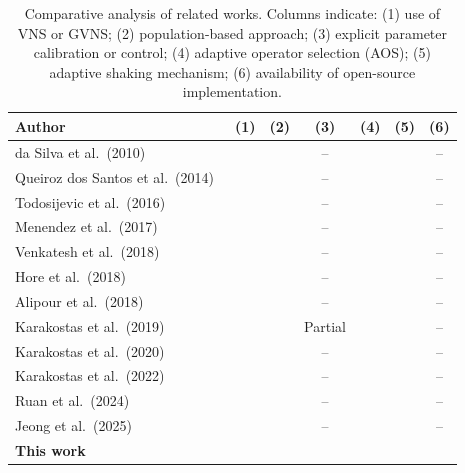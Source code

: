 \documentclass[runningheads]{llncs}
\newcommand{\cmark}{\ding{51}} %
\newcommand{\xmark}{\ding{55}} %
\begin{document}
\begin{table}[ht]
\centering
\caption{
Comparative analysis of related works.
Columns indicate: 
(1) use of VNS or GVNS; 
(2) population-based approach; 
(3) explicit parameter calibration or control; 
(4) adaptive operator selection (AOS); 
(5) adaptive shaking mechanism; 
(6) availability of open-source implementation.
}
\label{tab:comparison}
\begin{tabular}{lcccccc}
\hline
\textbf{Author} & \textbf{(1)} & \textbf{(2)} & \textbf{(3)} & \textbf{(4)} & \textbf{(5)} & \textbf{(6)} \\
\hline
da Silva et al.~(2010)~\cite{DASILVA2010203}       
& \cmark & \xmark & --      & \xmark & \xmark & -- \\

Queiroz dos Santos et al.~(2014)~\cite{QUEIROZDOSSANTOS20144939} 
& \cmark & \xmark & --      & \cmark & \xmark & -- \\

Todosijevic et al.~(2016)~\cite{TODOSIJEVIC2016873}      
& \cmark & \xmark & --      & \cmark & \xmark & -- \\

Menendez et al.~(2017)~\cite{MENENDEZ201782} 
& \cmark & \xmark & --      & \xmark & \xmark & -- \\

Venkatesh et al.~(2018)~\cite{VENKATESH2018189}        
& \cmark & \xmark & --      & \xmark & \xmark & -- \\

Hore et al.~(2018)~\cite{HORE201883}              
& \cmark & \xmark & --      & \xmark & \xmark & -- \\

Alipour et al.~(2018)~\cite{Alipour2018}            
& \xmark & \cmark & --      & \xmark & \xmark & -- \\

Karakostas et al.~(2019)~\cite{KARAKOSTAS2019263} 
& \cmark & \xmark & Partial & \xmark & \xmark & -- \\

Karakostas et al.~(2020)~\cite{KARAKOSTAS2020106913}         
& \cmark & \xmark & --      & \xmark & \xmark & -- \\

Karakostas et al.~(2022)~\cite{KARAKOSTAS2022108746}   
& \cmark & \xmark & --      & \cmark & \cmark & -- \\

Ruan et al.~(2024)~\cite{ruan2024rlga_tsp}               
& \xmark & \cmark & --      & \xmark & \xmark & -- \\

Jeong et al.~(2025)~\cite{JEONG2025113930}             
& \xmark & \cmark & --      & \cmark & \xmark & -- \\

\hline
\textbf{This work}               
& \cmark & \xmark & \cmark & \cmark & \cmark & \cmark \\
\hline
\end{tabular}
\end{table}
\end{document}
